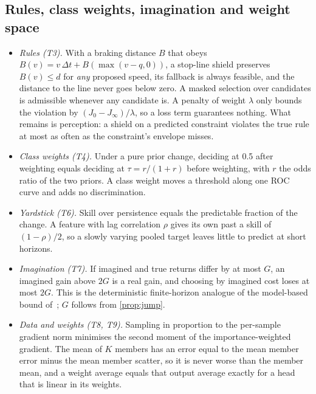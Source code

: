 \documentclass[10pt,twocolumn]{article}
\theoremstyle{remark}
\begin{document}
\subsection{Rules, class weights, imagination and weight space}
\begin{itemize}
  \item \emph{Rules (T3).} With a braking distance $B$ that obeys $B(v)=v\,\Delta t+B(\max(v-q,0))$, a stop-line shield preserves
        $B(v)\le d$ for \emph{any} proposed speed, its fallback is always feasible, and the distance to the line never goes below
        zero. A masked selection over candidates is admissible whenever any candidate is. A penalty of weight $\lambda$ only bounds
        the violation by $(J_0-J_\infty)/\lambda$, so a loss term guarantees nothing. What remains is perception: a shield on a
        predicted constraint violates the true rule at most as often as the constraint's envelope misses.
  \item \emph{Class weights (T4).} Under a pure prior change, deciding at 0.5 after weighting equals deciding at
        $\tau=r/(1+r)$ before weighting, with $r$ the odds ratio of the two priors. A class weight moves a threshold along one ROC
        curve and adds no discrimination.
  \item \emph{Yardstick (T6).} Skill over persistence equals the predictable fraction of the change. A feature with lag correlation
        $\rho$ gives its own past a skill of $(1-\rho)/2$, so a slowly varying pooled target leaves little to predict at short
        horizons.
  \item \emph{Imagination (T7).} If imagined and true returns differ by at most $G$, an imagined gain above $2G$ is a real gain, and
        choosing by imagined cost loses at most $2G$. This is the deterministic finite-horizon analogue of the model-based bound
        of~\cite{mbpo}; $G$ follows from \cref{prop:jump}.
  \item \emph{Data and weights (T8, T9).} Sampling in proportion to the per-sample gradient norm minimises the second moment of
        the importance-weighted gradient. The mean of $K$ members has an error equal to the mean member error minus the mean member
        scatter, so it is never worse than the member mean, and a weight average equals that output average exactly for a head that
        is linear in its weights.
\end{itemize}
\end{document}
